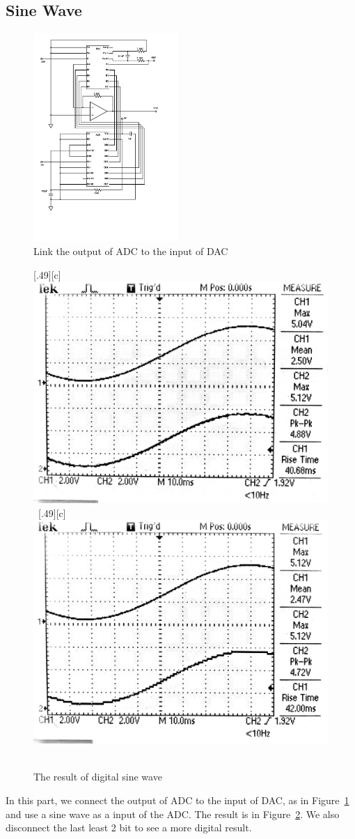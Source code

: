 \documentclass[aps,prl,reprint]{revtex4-1}
\begin{document}
    \subsection{Sine Wave}
        \begin{figure}[h]
            \centering
            \includegraphics[width=0.49\textwidth]{image/ADC-DAC.pdf}
            \caption{Link the output of ADC to the input of DAC}
            \label{fig:sine}
        \end{figure}
        \begin{figure}[t]
            \centering
            [.49\linewidth][c]{%
                \includegraphics[width=.49\linewidth]{image/sine1.pdf}}\ 
            [.49\linewidth][c]{%
                \includegraphics[width=.49\linewidth]{image/sine2.pdf}}\ 
            \caption{The result of digital sine wave}
            \label{fig:sinePlot}
        \end{figure}
        In this part, we connect the output of ADC to the input of DAC, as in Figure~\ref{fig:sine} and use a sine wave as a input of the ADC. The result is in Figure~\ref{fig:sinePlot}. We also disconnect the last least 2 bit to see a more digital result.
\end{document}
